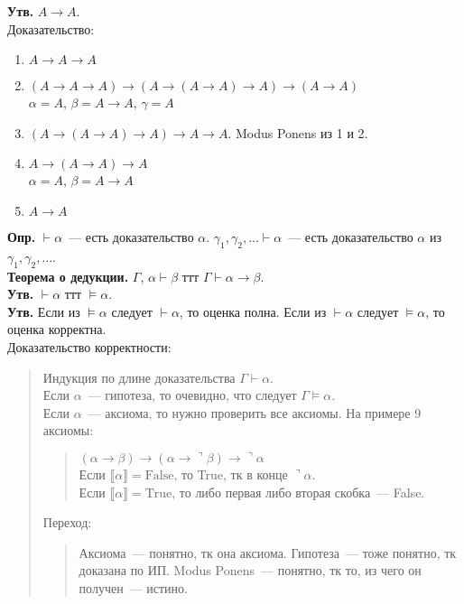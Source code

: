 \documentclass{article}
\begin{document}
	\textbf{Утв.} $A \rightarrow A$. \\
	Доказательство:
	\begin{enumerate}
		\item $A \rightarrow A \rightarrow A$
		\item $(A \rightarrow A \rightarrow A) \rightarrow (A \rightarrow (A \rightarrow A) \rightarrow A) \rightarrow (A \rightarrow A)$ \\
		$\alpha = A$, $\beta = A \rightarrow A$, $\gamma = A$
		\item $(A \rightarrow (A \rightarrow A) \rightarrow A) \rightarrow A \rightarrow A$. Modus Ponens из 1 и 2.
		\item $A \rightarrow (A \rightarrow A) \rightarrow A $ \\
		$\alpha = A$, $\beta = A \rightarrow A$
		\item $A \rightarrow A$
	\end{enumerate}
	\textbf{Опр.} $\vdash \alpha$~--- есть доказательство $\alpha$. $\gamma_1, \gamma_2, \dots \vdash \alpha$~--- есть доказательство $\alpha$ из $\gamma_1, \gamma_2, \dots$. \\
	\textbf{Теорема о дедукции.} $\Gamma$, $\alpha \vdash \beta$ ттт $\Gamma \vdash \alpha \rightarrow \beta$. \\
	\textbf{Утв.} $\vdash \alpha$ ттт $\vDash \alpha$. \\
	\textbf{Утв.} Если из $\vDash \alpha$ следует $\vdash \alpha$, то оценка полна. Если из $\vdash \alpha$ следует $\vDash \alpha$, то оценка корректна. \\
	Доказательство корректности:
	\begin{quote}
		Индукция по длине доказательства $\Gamma \vdash \alpha$. \\
		Если $\alpha$~--- гипотеза, то очевидно, что следует $\Gamma \vDash \alpha$. \\
		Если $\alpha$~--- аксиома, то нужно проверить все аксиомы. На примере 9 аксиомы:
		\begin{quote}
			$(\alpha \rightarrow \beta) \rightarrow (\alpha \rightarrow \urcorner \beta) \rightarrow \urcorner \alpha$ \\
			Если $\llbracket \alpha \rrbracket = \text{False}$, то True, тк в конце $\urcorner \alpha$. \\
			Если $\llbracket \alpha \rrbracket = \text{True}$, то либо первая либо вторая скобка~--- False.
		\end{quote}
		Переход:
		\begin{quote}
			Аксиома~--- понятно, тк она аксиома. Гипотеза~--- тоже понятно, тк доказана по ИП. Modus Ponens~--- понятно, тк то, из чего он получен~--- истино.
		\end{quote}
	\end{quote}
\end{document}
